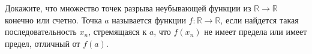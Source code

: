 Докажите, что множество точек разрыва неубывающей функции из $\mathbb{R} \to \mathbb{R}$ конечно или
счетно. Точка $a$ называется  функции $f\colon \mathbb{R} \to \mathbb{R}$, если
найдется такая последовательность $x_n$, стремящаяся к $a$, что $f(x_n)$ не имеет предела или имеет
предел, отличный от $f(a)$.
